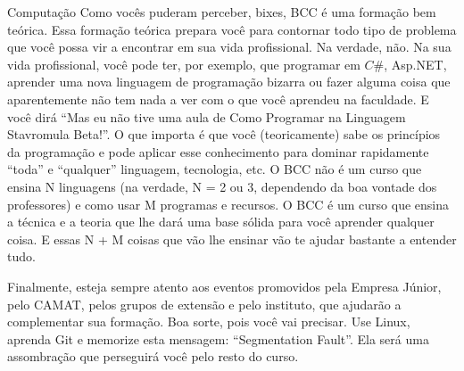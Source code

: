 \begin{subsecao}{Computação}
Como vocês puderam perceber, bixes, BCC é uma formação bem teórica. Essa
formação teórica prepara você para contornar todo tipo de problema que você
possa vir a encontrar em sua vida profissional. Na verdade, não. Na sua vida
profissional, você pode ter, por exemplo, que programar em $C\#$, Asp.NET,
aprender uma nova linguagem de programação bizarra ou fazer alguma coisa que
aparentemente não tem nada a ver com o que você aprendeu na faculdade. E você
dirá ``Mas eu não tive uma aula de Como Programar na Linguagem Stavromula
Beta!''. O que importa é que você (teoricamente) sabe os princípios da
programação e pode aplicar esse conhecimento para dominar rapidamente ``toda'' e
``qualquer'' linguagem, tecnologia, etc. O BCC não é um curso que ensina N
linguagens (na verdade, N = 2 ou 3, dependendo da boa vontade dos professores) e
como usar M programas e recursos. O BCC é um curso que ensina a técnica e a
teoria que lhe dará uma base sólida para você aprender qualquer coisa. E essas N
+ M coisas que vão lhe ensinar vão te ajudar bastante a entender tudo.

Finalmente, esteja sempre atento aos eventos promovidos pela Empresa Júnior,
pelo CAMAT, pelos grupos de extensão e pelo instituto, que ajudarão a
complementar sua formação. Boa sorte, pois você vai precisar. Use Linux, aprenda
Git e memorize esta mensagem: ``Segmentation Fault''. Ela será uma assombração
que perseguirá você pelo resto do curso.

\end{subsecao}
